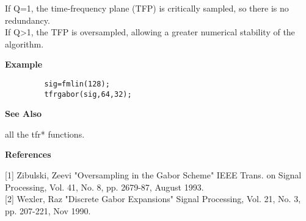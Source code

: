 \newpage

\hspace*{1.5cm}
\begin{minipage}[t]{13.5cm}
If {\ty Q=1}, the time-frequency plane (TFP) is critically sampled, so
there is no redundancy.\\
If {\ty Q>1}, the TFP is oversampled, allowing a greater numerical
stability of the algorithm. \\

\end{minipage}
\vspace*{1cm}

{\bf \large {}\selectfont Example}
\begin{verbatim}
         sig=fmlin(128); 
         tfrgabor(sig,64,32); 
\end{verbatim}
\vspace*{.5cm}

{\bf \large {}\selectfont See Also}\\
\hspace*{1.5cm}
\begin{minipage}[t]{13.5cm}
all the {\ty tfr*} functions.
\end{minipage}
\vspace*{.5cm}


{\bf \large {}\selectfont References}\\
\hspace*{1.5cm}
\begin{minipage}[t]{13.5cm}
[1] Zibulski, Zeevi "Oversampling in the Gabor Scheme" IEEE Trans. on
	    Signal Processing, Vol. 41, No. 8, pp. 2679-87, August 1993.\\ 

[2] Wexler, Raz "Discrete Gabor Expansions" Signal Processing, Vol. 21, No.
	    3, pp. 207-221, Nov 1990.

\end{minipage}
